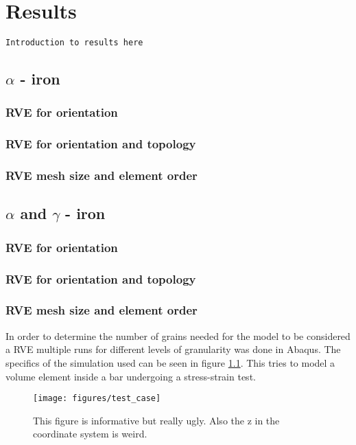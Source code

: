 \documentclass[convergence.tex]{subfiles}
\begin{document}
\chapter{Results}

\texttt{Introduction to results here}

\section{$\alpha$ - iron}

\subsection{RVE for orientation}

\subsection{RVE for orientation and topology}

\subsection{RVE mesh size and element order}

\section{$\alpha$ and $\gamma$ - iron}

\subsection{RVE for orientation}

\subsection{RVE for orientation and topology}

\subsection{RVE mesh size and element order}

In order to determine the number of grains needed for the model to be considered a RVE multiple runs for different levels of granularity was done in Abaqus. The specifics of the simulation used can be seen in figure \ref{fig:test_case}. This tries to model a volume element inside a bar undergoing a stress-strain test. 

\begin{figure}[ht]
\centering
\texttt{[image: figures/test\_case]}
\caption{This figure is informative but really ugly. Also the z in the coordinate system is weird.}
\label{fig:test_case}
\end{figure}
\end{document}
